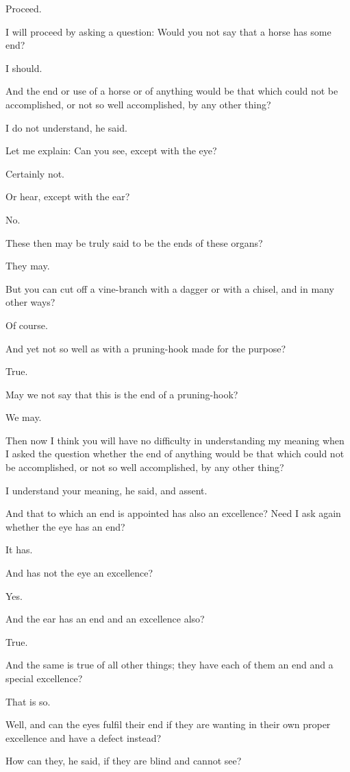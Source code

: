 Proceed.

I will proceed by asking a question: Would you not say that a horse has
some end?

I should.

And the end or use of a horse or of anything would be that which could
not be accomplished, or not so well accomplished, by any other thing?

I do not understand, he said.

Let me explain: Can you see, except with the eye?

Certainly not.

Or hear, except with the ear?

No.

These then may be truly said to be the ends of these organs?

They may.

But you can cut off a vine-branch with a dagger or with a chisel, and in
many other ways?

Of course.

And yet not so well as with a pruning-hook made for the purpose?

True.

May we not say that this is the end of a pruning-hook?

We may.

Then now I think you will have no difficulty in understanding my meaning
when I asked the question whether the end of anything would be that
which could not be accomplished, or not so well accomplished, by any
other thing?

I understand your meaning, he said, and assent.

And that to which an end is appointed has also an excellence? Need I ask
again whether the eye has an end?

It has.

And has not the eye an excellence?

Yes.

And the ear has an end and an excellence also?

True.

And the same is true of all other things; they have each of them an end
and a special excellence?

That is so.

Well, and can the eyes fulfil their end if they are wanting in their own
proper excellence and have a defect instead?

How can they, he said, if they are blind and cannot see?

